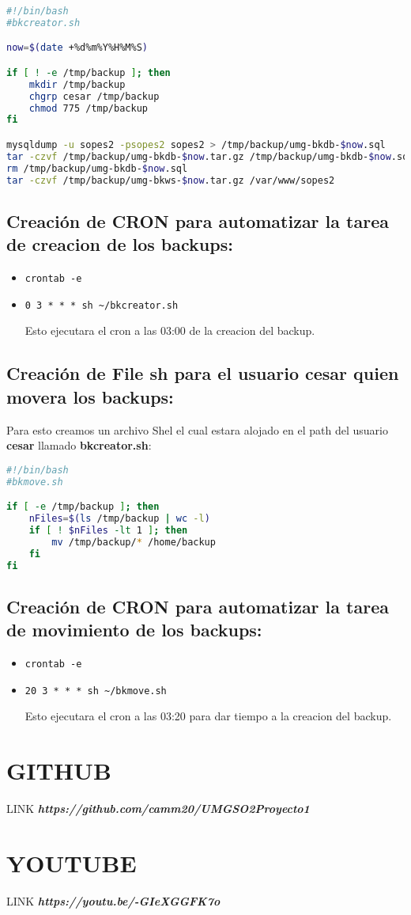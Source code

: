 \documentclass{article}
\begin{document}
\begin{lstlisting}[language=bash]
#!/bin/bash
#bkcreator.sh

now=$(date +%d%m%Y%H%M%S)

if [ ! -e /tmp/backup ]; then
	mkdir /tmp/backup
	chgrp cesar /tmp/backup
	chmod 775 /tmp/backup
fi

mysqldump -u sopes2 -psopes2 sopes2 > /tmp/backup/umg-bkdb-$now.sql
tar -czvf /tmp/backup/umg-bkdb-$now.tar.gz /tmp/backup/umg-bkdb-$now.sql
rm /tmp/backup/umg-bkdb-$now.sql
tar -czvf /tmp/backup/umg-bkws-$now.tar.gz /var/www/sopes2
\end{lstlisting}

\subsection{Creación de CRON para automatizar la tarea de creacion de los backups:}
\begin{itemize}
\item \verb|crontab -e|
\item \verb|0 3 * * * sh ~/bkcreator.sh|

Esto ejecutara el cron a las 03:00 de la creacion del backup.
\end{itemize}

\subsection{Creación de File sh para el usuario \textbf{cesar} quien movera los backups:}

Para esto creamos un archivo Shel el cual estara alojado en el path del usuario \textbf{cesar} llamado \textbf{bkcreator.sh}:

\begin{lstlisting}[language=bash]
#!/bin/bash
#bkmove.sh

if [ -e /tmp/backup ]; then
	nFiles=$(ls /tmp/backup | wc -l)
	if [ ! $nFiles -lt 1 ]; then
		mv /tmp/backup/* /home/backup
	fi
fi

\end{lstlisting}

\subsection{Creación de CRON para automatizar la tarea de movimiento de los backups:}
\begin{itemize}
\item \verb|crontab -e|
\item \verb|20 3 * * * sh ~/bkmove.sh|

Esto ejecutara el cron a las 03:20 para dar tiempo a la creacion del backup.
\end{itemize}

\section{GITHUB}

LINK \textbf{\textit{https://github.com/camm20/UMGSO2Proyecto1}}

\section{YOUTUBE}
LINK \textbf{\textit{https://youtu.be/-GIeXGGFK7o}}
\end{document}
